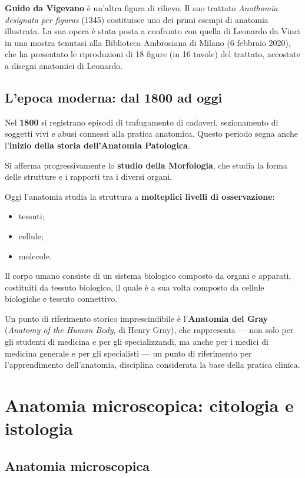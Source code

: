 \textbf{Guido da Vigevano} è un'altra figura di rilievo. Il suo trattato \textit{Anothomia designata per figuras} (1345) costituisce uno dei primi esempi di anatomia illustrata. La sua opera è stata posta a confronto con quella di Leonardo da Vinci in una mostra tenutasi alla Biblioteca Ambrosiana di Milano (6 febbraio 2020), che ha presentato le riproduzioni di 18 figure (in 16 tavole) del trattato, accostate a disegni anatomici di Leonardo.

\subsection{L'epoca moderna: dal 1800 ad oggi}

Nel \textbf{1800} si registrano episodi di trafugamento di cadaveri, sezionamento di soggetti vivi e abusi connessi alla pratica anatomica. Questo periodo segna anche l'\textbf{inizio della storia dell'Anatomia Patologica}.

Si afferma progressivamente lo \textbf{studio della Morfologia}, che studia la forma delle strutture e i rapporti tra i diversi organi.

Oggi l'anatomia studia la struttura a \textbf{molteplici livelli di osservazione}:
\begin{itemize}
  \item tessuti;
  \item cellule;
  \item molecole.
\end{itemize}

Il corpo umano consiste di un sistema biologico composto da organi e apparati, costituiti da tessuto biologico, il quale è a sua volta composto da cellule biologiche e tessuto connettivo.

Un punto di riferimento storico imprescindibile è l'\textbf{Anatomia del Gray} (\textit{Anatomy of the Human Body}, di Henry Gray), che rappresenta --- non solo per gli studenti di medicina e per gli specializzandi, ma anche per i medici di medicina generale e per gli specialisti --- un punto di riferimento per l'apprendimento dell'anatomia, disciplina considerata la base della pratica clinica.

\section{Anatomia microscopica: citologia e istologia}

\subsection{Anatomia microscopica}

